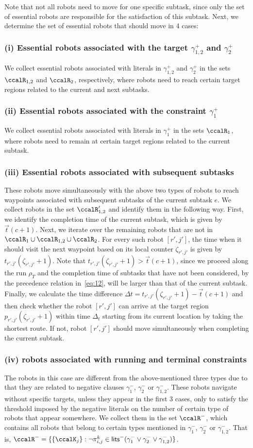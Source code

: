 \documentclass[journal]{IEEEtran}
\renewcommand{\ap}[3]{\mathcal{\pi}_{{#1},{#2}}^{#3}}
\newcommand{\domanda}[1]{\subsubsection*{#1}}
\begin{document}
{Note that not all robots need to move for one specific subtask, since only the set of essential robots are responsible for the satisfaction of this subtask.  Next, we determine the set of essential robots that should move in 4 cases:
\domanda{(i) Essential robots associated with the target $\gamma_{1,2}^{+}$ and $\gamma_2^{+}$}  We collect essential robots associated with literals in $\gamma_{1,2}^{+}$ and $\gamma_2^{+}$ in the sets $\ccalR_{1,2}$ and $\ccalR_2$, respectively, where  robots need to reach certain target regions related to the current and next subtasks.
\domanda{(ii) Essential robots associated with the constraint $\gamma_1^+$} We collect essential robots associated with literals in $\gamma_{1}^{+}$ in the sets $\ccalR_{1}$,  where robots need to remain at certain target regions related to the current subtask.
\domanda{(iii) Essential robots associated with subsequent subtasks} These robots move simultaneously with the above two types of robots to reach  waypoints associated with subsequent subtasks of the current subtask $e$. We collect robots in the set $\ccalR'_{1,2}$ and identify them in the following way. First, we identify the completion time  of the current subtask, which is given by $\vec{t}(c+1)$.  Next, we iterate over the remaining robots that are not in $\ccalR_1 \cup \ccalR_{1,2} \cup \ccalR_2$. For every such robot $[r',j']$, the time when it should visit the next waypoint based on its local counter $\zeta_{r',j'}$ is given by $t_{r',j'}(\zeta_{r',j'}+1)$. Note that {$t_{r', j'}(\zeta_{r',j'}+1) > \vec{t}(c+1)$}, since we proceed along the run $\rho_T$ and the completion time of  subtasks that have not been considered, by the precedence relation in~\eqref{eq:12}, will be larger than that of the current subtask. Finally, we calculate the time difference $\Delta t = t_{r', j'}(\zeta_{r',j'}+1) - \vec{t}(c+1)$  and then check whether the robot $[r', j']$ can arrive at the target region $p_{r',j'}(\zeta_{r',j'}+1)$  within time $\Delta_t$ starting from  its current location by taking the shortest route. {If not, robot $[r', j']$ should move simultaneously when completing the current subtask.}
\domanda{(iv) robots associated with running and terminal constraints} The robots in this case  are different from the above-mentioned three types due to that they are related to negative clauses $\gamma_1^-$, $\gamma_2^-$ or $\gamma_{1,2}^-$. These robots navigate without specific targets, unless they appear in the first 3 cases, only to satisfy the threshold imposed by the negative literals on the number of certain type of robots that appear somewhere. We collect them in the set $\ccalR^-$, which contains all robots that belong to certain types mentioned in $\gamma_1^-$, $\gamma_2^-$ or $\gamma_{1,2}^-$. That is, $\ccalR^- = \{\{\ccalK_j\}: \neg \ap{i}{j}{k} \in \mathsf{lits}^- (\gamma_1^- \vee \gamma_2^- \vee \gamma_{1,2}^-) \}$.

}
\end{document}
